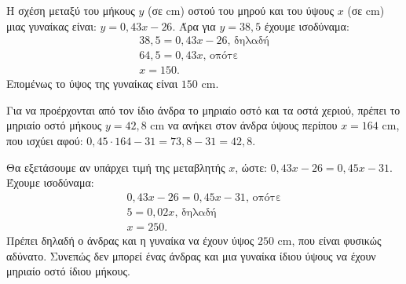 
\begin{alist}
\item Η σχέση μεταξύ του μήκους $y$ (σε cm) οστού του μηρού και του ύψους $x$ (σε cm) μιας
γυναίκας είναι: $y = 0,43x - 26$. Άρα για $y = 38,5$ έχουμε ισοδύναμα:
\begin{gather*}
38,5 = 0,43x - 26\text{, δηλαδή} \\
64,5 = 0,43x\text{, οπότε} \\
x = 150.
\end{gather*}
Επομένως το ύψος της γυναίκας είναι $150 \text{ cm}$.

\item Για να προέρχονται από τον ίδιο άνδρα το μηριαίο οστό και τα οστά χεριού, πρέπει το
μηριαίο οστό μήκους $y = 42,8 \text{ cm}$ να ανήκει στον άνδρα ύψους περίπου $x = 164 \text{ cm}$, που
ισχύει αφού: $0,45 \cdot 164 - 31 = 73,8 - 31 = 42,8$.

\item Θα εξετάσουμε αν υπάρχει τιμή της μεταβλητής $x$, ώστε: $0,43x - 26 = 0,45x - 31$.
Έχουμε ισοδύναμα:
\begin{gather*}
0,43x - 26 = 0,45x - 31\text{, οπότε} \\
5 = 0,02x\text{, δηλαδή} \\
x = 250.
\end{gather*}
Πρέπει δηλαδή ο άνδρας και η γυναίκα να έχουν ύψος $250 \text{ cm}$, που είναι φυσικώς αδύνατο.
Συνεπώς δεν μπορεί ένας άνδρας και μια γυναίκα ίδιου ύψους να έχουν μηριαίο οστό ίδιου
μήκους.
\end{alist}

